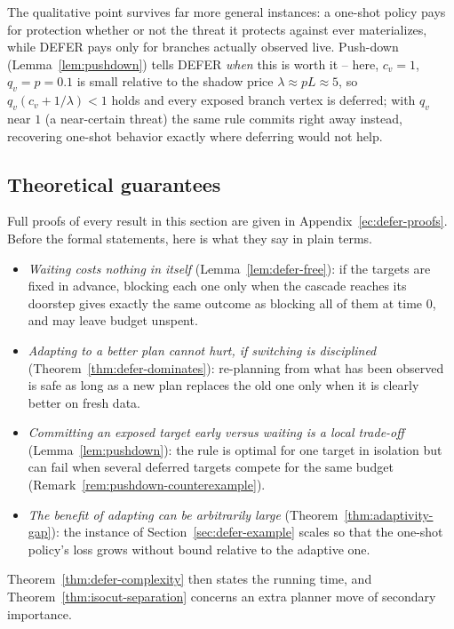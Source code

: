 \documentclass[ASNA,number]{USG}
\begin{document}
The qualitative point survives far more general instances: a one-shot
policy pays for protection whether or not the threat it protects against
ever materializes, while DEFER pays only for branches actually observed
live. Push-down (Lemma~\ref{lem:pushdown}) tells DEFER \emph{when} this is
worth it -- here, $c_v=1$, $q_v=p=0.1$ is small relative to the shadow
price $\lambda\approx pL\approx5$, so $q_v(c_v+1/\lambda)<1$ holds and
every exposed branch vertex is deferred; with $q_v$ near $1$ (a
near-certain threat) the same rule commits right away instead, recovering
one-shot behavior exactly where deferring would not help.

\subsection{Theoretical guarantees}\label{sec:defer-theory}

Full proofs of every result in this section are given in
Appendix~\ref{ec:defer-proofs}. Before the formal statements, here
is what they say in plain terms.
\begin{itemize}
\item \emph{Waiting costs nothing in itself} (Lemma~\ref{lem:defer-free}):
  if the targets are fixed in advance, blocking each one only when the
  cascade reaches its doorstep gives exactly the same outcome as blocking
  all of them at time $0$, and may leave budget unspent.
\item \emph{Adapting to a better plan cannot hurt, if switching is
  disciplined} (Theorem~\ref{thm:defer-dominates}): re-planning from what
  has been observed is safe as long as a new plan replaces the old one only
  when it is clearly better on fresh data.
\item \emph{Committing an exposed target early versus waiting is a
  local trade-off} (Lemma~\ref{lem:pushdown}): the rule is optimal for one
  target in isolation but can fail when several deferred targets compete for
  the same budget (Remark~\ref{rem:pushdown-counterexample}).
\item \emph{The benefit of adapting can be arbitrarily large}
  (Theorem~\ref{thm:adaptivity-gap}): the instance of
  Section~\ref{sec:defer-example} scales so that the one-shot policy's
  loss grows without bound relative to the adaptive one.
\end{itemize}
Theorem~\ref{thm:defer-complexity} then states the running time, and
Theorem~\ref{thm:isocut-separation} concerns an extra planner move of
secondary importance.
\end{document}
